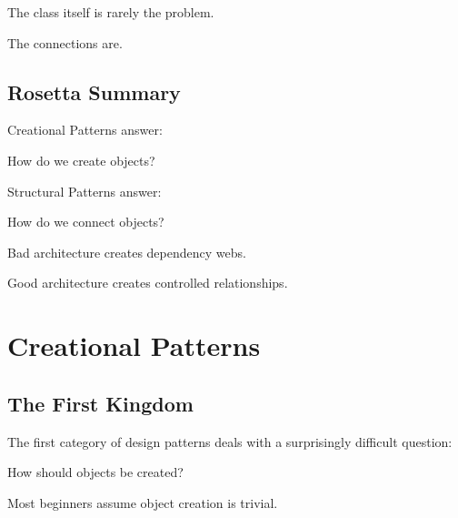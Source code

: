 \documentclass[11pt,a4paper]{book}
\begin{document}
The class itself is rarely the problem.

The connections are.

\section{Rosetta Summary}

\begin{rosettarule}

Creational Patterns answer:

How do we create objects?

\end{rosettarule}

\begin{rosettarule}

Structural Patterns answer:

How do we connect objects?

\end{rosettarule}

\begin{rosettarule}

Bad architecture creates dependency webs.

\end{rosettarule}

\begin{rosettarule}

Good architecture creates controlled relationships.

\end{rosettarule}
\chapter{Creational Patterns}

\section{The First Kingdom}

\begin{idea}

The first category of design patterns deals with a
surprisingly difficult question:

How should objects be created?

Most beginners assume object creation is trivial.

\end{idea}
\end{document}
